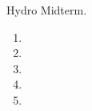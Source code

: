 \documentclass[12pt,preprint]{aastex}  %
\def\pb{\pagebreak}
\begin{document}
Hydro Midterm.

\begin{enumerate}
\item 
\pb
\item  
\pb
\item 
\pb
\item 
\pb
\item 
\end{enumerate}
\end{document}

